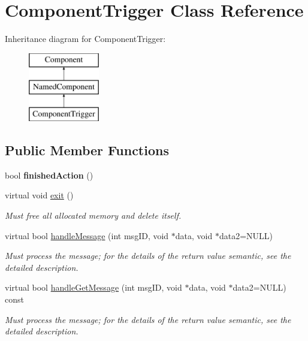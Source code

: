 \hypertarget{classComponentTrigger}{
\section{\-Component\-Trigger \-Class \-Reference}
\label{de/d82/classComponentTrigger}
}
\-Inheritance diagram for \-Component\-Trigger\-:\begin{figure}[H]
\begin{center}
\leavevmode
\includegraphics[height=3.000000cm]{de/d82/classComponentTrigger}
\end{center}
\end{figure}
\subsection*{\-Public \-Member \-Functions}
\begin{DoxyCompactItemize}
\item 
\hypertarget{classComponentTrigger_ab90a8c82cb4b163e28f9e56827801598}{
bool {\bfseries finished\-Action} ()}
\label{de/d82/classComponentTrigger_ab90a8c82cb4b163e28f9e56827801598}

\item 
\hypertarget{classComponentTrigger_aeaf0381d4d4e9295e64a9643372f95d4}{
virtual void \hyperlink{classComponentTrigger_aeaf0381d4d4e9295e64a9643372f95d4}{exit} ()}
\label{de/d82/classComponentTrigger_aeaf0381d4d4e9295e64a9643372f95d4}

\begin{DoxyCompactList}\small\item\em \-Must free all allocated memory and delete itself. \end{DoxyCompactList}\item 
virtual bool \hyperlink{classComponentTrigger_af59fa164bcae065d5bb763077fdae39d}{handle\-Message} (int msg\-I\-D, void $\ast$data, void $\ast$data2=\-N\-U\-L\-L)
\begin{DoxyCompactList}\small\item\em \-Must process the message; for the details of the return value semantic, see the detailed description. \end{DoxyCompactList}\item 
virtual bool \hyperlink{classComponentTrigger_a1e38ef841918a6ca9094e50225499249}{handle\-Get\-Message} (int msg\-I\-D, void $\ast$data, void $\ast$data2=\-N\-U\-L\-L) const 
\begin{DoxyCompactList}\small\item\em \-Must process the message; for the details of the return value semantic, see the detailed description. \end{DoxyCompactList}\end{DoxyCompactItemize}
